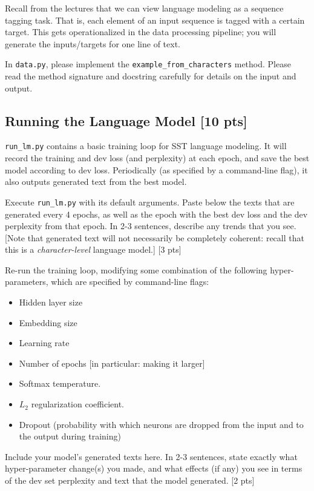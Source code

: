 \documentclass[11pt]{article}
\begin{document}
\vspace{2em}
 Recall from the lectures that we can view language modeling as a sequence tagging task.  That is, each element of an input sequence is tagged with a certain target.  This gets operationalized in the data processing pipeline; you will generate the inputs/targets for one line of text.

\noindent In \texttt{data.py}, please implement the \texttt{example\_from\_characters} method.  Please read the method signature and docstring carefully for details on the input and output. 

\subsection{Running the Language Model [10 pts]}

\texttt{run\_lm.py} contains a basic training loop for SST language modeling. It will record the training and dev loss (and perplexity) at each epoch, and save the best model according to dev loss.  Periodically (as specified by a command-line flag), it also outputs generated text from the best model.

\vspace{2em}
 Execute \texttt{run\_lm.py} with its default arguments.  Paste below the texts that are generated every 4 epochs, as well as the epoch with the best dev loss and the dev perplexity from that epoch.  In 2-3 sentences, describe any trends that you see.  [Note that generated text will not necessarily be completely coherent: recall that this is a \emph{character-level} language model.] \hfill [3 pts]

\vspace{2em}
 Re-run the training loop, modifying some combination of the following hyper-parameters, which are specified by command-line flags:
\begin{itemize}
  \item Hidden layer size
  \item Embedding size
  \item Learning rate
  \item Number of epochs [in particular: making it larger]
  \item Softmax temperature. 
  \item $L_2$ regularization coefficient.
  \item Dropout (probability with which neurons are dropped from the input and to the output during training)
\end{itemize}
Include your model's generated texts here.  In 2-3 sentences, state exactly what hyper-parameter change(s) you made, and what effects (if any) you see in terms of the dev set perplexity and text that the model generated. \hfill [2 pts]
\end{document}
